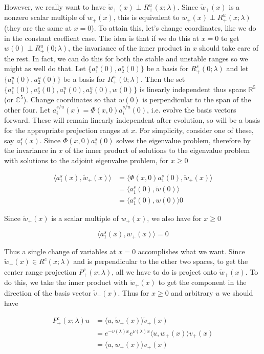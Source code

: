 \documentclass[12pt]{article}
\def\R{{\mathbb R}}
\def\C{{\mathbb C}}
\begin{document}
However, we really want to have $\tilde{w}_+(x) \perp R^u_+(x; \lambda)$. Since $\tilde{w}_+(x)$ is a nonzero scalar multiple of $w_+(x)$, this is equivalent to $w_+(x) \perp R^u_+(x; \lambda)$ (they are the same at $x = 0$). To attain this, let's change coordinates, like we do in the constant coeffient case. The idea is that if we do this at $x = 0$ to get $w(0) \perp R^u_+(0; \lambda)$, the invariance of the inner product in $x$ should take care of the rest. In fact, we can do this for both the stable and unstable ranges so we might as well do that. Let $\{ a^s_1(0), a^s_2(0)\}$ be a basis for $R^s_+(0; \lambda)$ and let $\{a^u_1(0), a^u_2(0)\}$ be a basis for $R^u_+(0; \lambda)$. Then the set $\{ a^s_1(0), a^s_2(0),a^u_1(0), a^u_2(0), w(0) \}$ is linearly independent thus spans $\R^5$ (or $\C^5$). Change coordinates so that $w(0)$ is perpendicular to the span of the other four. Let $a^{s/u}_i(x) = \Phi(x,0)a^{s/u}_i(0)$, i.e. evolve the basis vectors forward. These will remain linearly independent after evolution, so will be a basis for the appropriate projection ranges at $x$. For simplicity, consider one of these, say $a^s_1(x)$. Since $\Phi(x,0) a^s_1(0)$ solves the eigenvalue problem, therefore by the invariance in $x$ of the inner product of solutions to the eigenvalue problem with solutions to the adjoint eigenvalue problem, for $x \geq 0$

\begin{align*}
\langle a^s_1(x), \tilde{w}_+(x) \rangle &= \langle \Phi(x,0) a^s_1(0), \tilde{w}_+(x) \rangle \\
&= \langle a^s_1(0), \tilde{w}(0) \rangle \\
&= \langle a^s_1(0), w(0) \rangle 0
\end{align*}

Since $\tilde{w}_+(x)$ is a scalar multiple of $w_+(x)$, we also have for $x \geq 0$

\[
\langle a^s_1(x), w_+(x) \rangle = 0
\]

Thus a single change of variables at $x = 0$ accomplishes what we want. Since $\tilde{w}_+(x) \in R^c(x; \lambda)$ and is perpendicular to the other two spaces, to get the center range projection $P^c_+(x; \lambda)$, all we have to do is project onto $\tilde{w}_+(x)$. To do this, we take the inner product with $\tilde{w}_+(x)$ to get the component in the direction of the basis vector $\tilde{v}_+(x)$. Thus for $x \geq 0$ and arbitrary $u$ we should have

\begin{align*}
P^c_+(x; \lambda)u &= \langle u, \tilde{w}_+(x) \rangle \tilde{v}_+(x) \\
&= e^{-\nu(\lambda)x} e^{\nu(\lambda) x }\langle u, w_+(x) \rangle v_+(x) \\
&= \langle u, w_+(x) \rangle v_+(x)
\end{align*}
\end{document}
